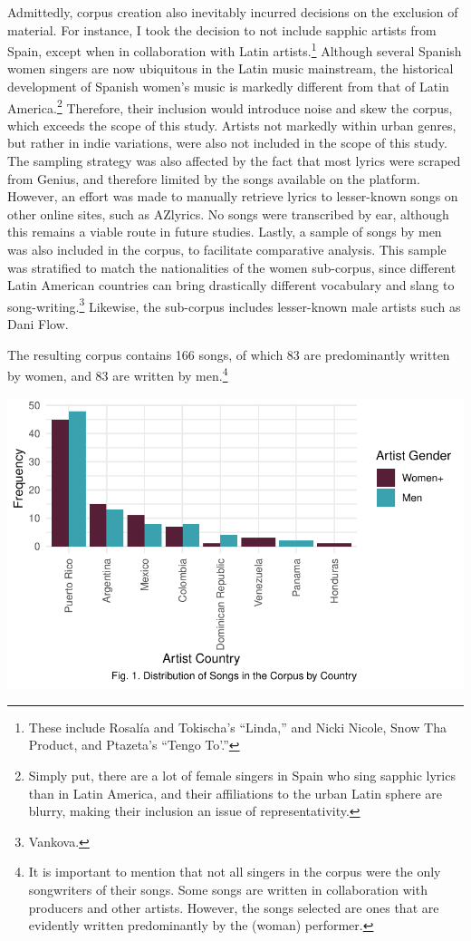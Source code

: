 \documentclass[
  letterpaper,
  DIV=11,
  numbers=noendperiod]{scrartcl}
\begin{document}
Admittedly, corpus creation also inevitably incurred decisions on the
exclusion of material. For instance, I took the decision to not include
sapphic artists from Spain, except when in collaboration with Latin
artists.\footnote{These include Rosalía and Tokischa's ``Linda,'' and
  Nicki Nicole, Snow Tha Product, and Ptazeta's ``Tengo To'.''} Although
several Spanish women singers are now ubiquitous in the Latin music
mainstream, the historical development of Spanish women's music is
markedly different from that of Latin America.\footnote{Simply put,
  there are a lot of female singers in Spain who sing sapphic lyrics
  than in Latin America, and their affiliations to the urban Latin
  sphere are blurry, making their inclusion an issue of
  representativity.} Therefore, their inclusion would introduce noise
and skew the corpus, which exceeds the scope of this study. Artists not
markedly within urban genres, but rather in indie variations, were also
not included in the scope of this study. The sampling strategy was also
affected by the fact that most lyrics were scraped from Genius, and
therefore limited by the songs available on the platform. However, an
effort was made to manually retrieve lyrics to lesser-known songs on
other online sites, such as AZlyrics. No songs were transcribed by ear,
although this remains a viable route in future studies. Lastly, a sample
of songs by men was also included in the corpus, to facilitate
comparative analysis. This sample was stratified to match the
nationalities of the women sub-corpus, since different Latin American
countries can bring drastically different vocabulary and slang to
song-writing.\footnote{Vankova.} Likewise, the sub-corpus includes
lesser-known male artists such as Dani Flow.

The resulting corpus contains 166 songs, of which 83 are predominantly
written by women, and 83 are written by men.\footnote{It is important to
  mention that not all singers in the corpus were the only songwriters
  of their songs. Some songs are written in collaboration with producers
  and other artists. However, the songs selected are ones that are
  evidently written predominantly by the (woman) performer.}~

\includegraphics{Sastoque_Essay3_files/figure-pdf/songs-by-country-1.pdf}
\end{document}
